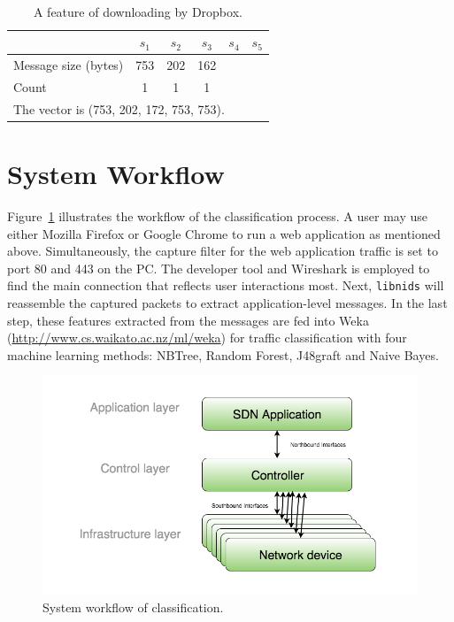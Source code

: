 \
\begin{table}[H]
\centering
\caption{A feature of downloading by Dropbox.}
\begin{tabular}{|l|c|c|c|c|c|}

\hline  & $s_1$ & $s_2$ & $s_3$ & $s_4$ & $s_5$ \\
\hline
\hline Message size (bytes) & 753 & 202 & 162 &  &\\
\hline Count & 1 & 1 & 1 &  &\\
\hline
\multicolumn{6}{l}{The vector is (753, 202, 172, 753, 753).}\\ 
\end{tabular}
\label{table:fill_same}
\end{table}


\section{System Workflow}
Figure~\ref{Fig.system} illustrates the workflow of the classification process. A user may use either Mozilla Firefox or Google Chrome to run a web application as mentioned above. Simultaneously, the capture filter for the web application traffic is set to port 80 and 443 on the PC. The developer tool and Wireshark is employed to find the main connection that reflects user interactions most. Next, \texttt{libnids} will reassemble the captured packets to extract application-level messages. In the last step, these features extracted from the messages are fed into Weka (\url{http://www.cs.waikato.ac.nz/ml/weka}) for traffic classification with four machine learning methods: NBTree, Random Forest, J48graft and Naive Bayes.


\begin{figure}[H]
\begin{center} 
\includegraphics[width=1.0\textwidth]{figures/SDN_structure.png}
\end{center}
\caption{System workflow of classification.}
\label{Fig.system}
\end{figure}